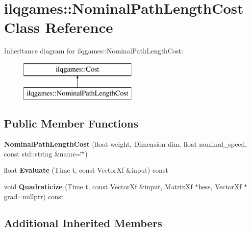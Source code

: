 \hypertarget{classilqgames_1_1_nominal_path_length_cost}{}\section{ilqgames\+:\+:Nominal\+Path\+Length\+Cost Class Reference}
\label{classilqgames_1_1_nominal_path_length_cost}
Inheritance diagram for ilqgames\+:\+:Nominal\+Path\+Length\+Cost\+:\begin{figure}[H]
\begin{center}
\leavevmode
\includegraphics[height=2.000000cm]{classilqgames_1_1_nominal_path_length_cost}
\end{center}
\end{figure}
\subsection*{Public Member Functions}
\begin{DoxyCompactItemize}
\item 
{\bfseries Nominal\+Path\+Length\+Cost} (float weight, Dimension dim, float nominal\+\_\+speed, const std\+::string \&name=\char`\"{}\char`\"{})\hypertarget{classilqgames_1_1_nominal_path_length_cost_a2dbd457c7e1b6c202d7c5f3b72bcecde}{}\label{classilqgames_1_1_nominal_path_length_cost_a2dbd457c7e1b6c202d7c5f3b72bcecde}

\item 
float {\bfseries Evaluate} (Time t, const Vector\+Xf \&input) const \hypertarget{classilqgames_1_1_nominal_path_length_cost_a3a8ac79f9c35f39328a0a7829881386f}{}\label{classilqgames_1_1_nominal_path_length_cost_a3a8ac79f9c35f39328a0a7829881386f}

\item 
void {\bfseries Quadraticize} (Time t, const Vector\+Xf \&input, Matrix\+Xf $\ast$hess, Vector\+Xf $\ast$grad=nullptr) const \hypertarget{classilqgames_1_1_nominal_path_length_cost_a114db71b61e3c8a6491fab22c4195321}{}\label{classilqgames_1_1_nominal_path_length_cost_a114db71b61e3c8a6491fab22c4195321}

\end{DoxyCompactItemize}
\subsection*{Additional Inherited Members}


